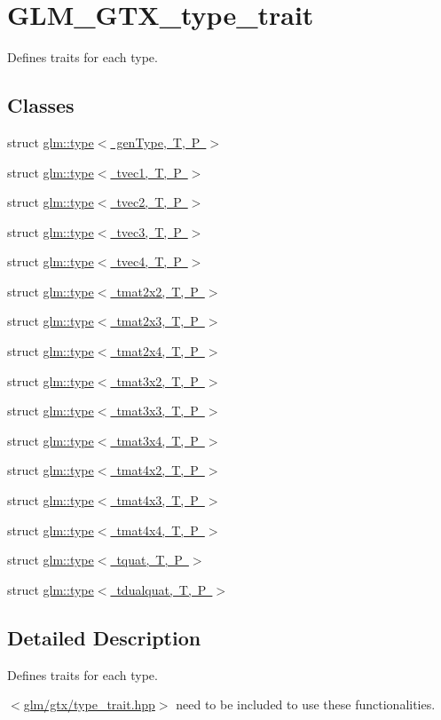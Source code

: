 \hypertarget{group__gtx__type__trait}{}\section{G\+L\+M\+\_\+\+G\+T\+X\+\_\+type\+\_\+trait}
\label{group__gtx__type__trait}


Defines traits for each type.  


\subsection*{Classes}
\begin{DoxyCompactItemize}
\item 
struct \mbox{\hyperlink{structglm_1_1type}{glm\+::type$<$ gen\+Type, T, P $>$}}
\item 
struct \mbox{\hyperlink{structglm_1_1type_3_01tvec1_00_01_t_00_01_p_01_4}{glm\+::type$<$ tvec1, T, P $>$}}
\item 
struct \mbox{\hyperlink{structglm_1_1type_3_01tvec2_00_01_t_00_01_p_01_4}{glm\+::type$<$ tvec2, T, P $>$}}
\item 
struct \mbox{\hyperlink{structglm_1_1type_3_01tvec3_00_01_t_00_01_p_01_4}{glm\+::type$<$ tvec3, T, P $>$}}
\item 
struct \mbox{\hyperlink{structglm_1_1type_3_01tvec4_00_01_t_00_01_p_01_4}{glm\+::type$<$ tvec4, T, P $>$}}
\item 
struct \mbox{\hyperlink{structglm_1_1type_3_01tmat2x2_00_01_t_00_01_p_01_4}{glm\+::type$<$ tmat2x2, T, P $>$}}
\item 
struct \mbox{\hyperlink{structglm_1_1type_3_01tmat2x3_00_01_t_00_01_p_01_4}{glm\+::type$<$ tmat2x3, T, P $>$}}
\item 
struct \mbox{\hyperlink{structglm_1_1type_3_01tmat2x4_00_01_t_00_01_p_01_4}{glm\+::type$<$ tmat2x4, T, P $>$}}
\item 
struct \mbox{\hyperlink{structglm_1_1type_3_01tmat3x2_00_01_t_00_01_p_01_4}{glm\+::type$<$ tmat3x2, T, P $>$}}
\item 
struct \mbox{\hyperlink{structglm_1_1type_3_01tmat3x3_00_01_t_00_01_p_01_4}{glm\+::type$<$ tmat3x3, T, P $>$}}
\item 
struct \mbox{\hyperlink{structglm_1_1type_3_01tmat3x4_00_01_t_00_01_p_01_4}{glm\+::type$<$ tmat3x4, T, P $>$}}
\item 
struct \mbox{\hyperlink{structglm_1_1type_3_01tmat4x2_00_01_t_00_01_p_01_4}{glm\+::type$<$ tmat4x2, T, P $>$}}
\item 
struct \mbox{\hyperlink{structglm_1_1type_3_01tmat4x3_00_01_t_00_01_p_01_4}{glm\+::type$<$ tmat4x3, T, P $>$}}
\item 
struct \mbox{\hyperlink{structglm_1_1type_3_01tmat4x4_00_01_t_00_01_p_01_4}{glm\+::type$<$ tmat4x4, T, P $>$}}
\item 
struct \mbox{\hyperlink{structglm_1_1type_3_01tquat_00_01_t_00_01_p_01_4}{glm\+::type$<$ tquat, T, P $>$}}
\item 
struct \mbox{\hyperlink{structglm_1_1type_3_01tdualquat_00_01_t_00_01_p_01_4}{glm\+::type$<$ tdualquat, T, P $>$}}
\end{DoxyCompactItemize}


\subsection{Detailed Description}
Defines traits for each type. 

$<$\mbox{\hyperlink{type__trait_8hpp}{glm/gtx/type\+\_\+trait.\+hpp}}$>$ need to be included to use these functionalities. 